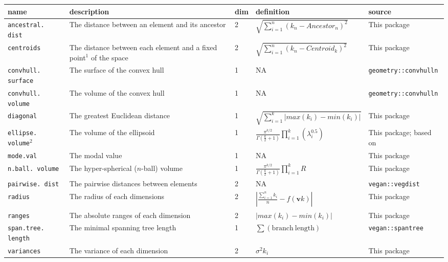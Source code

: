 \documentclass[12pt,letterpaper]{article}
\begin{document}
\begin{table}
\resizebox{\textwidth}{!}
{%
    \begin{tabular}{p{2cm}|p{5cm}|p{1cm}|p{5cm}|p{5cm}}
        name & description & dim & definition & source \\
        \hline
        \texttt{ancestral. dist} & The distance between an element and its ancestor & 2 & $\sqrt{\sum_{i=1}^{n}{({k}_{n}-Ancestor_{n})^2}}$ & This package \\
        \texttt{centroids} & The distance between each element and a fixed point$^1$ of the space & 2 & $\sqrt{\sum_{i=1}^{n}{({k}_{n}-Centroid_{k})^2}}$ & This package \\
        \texttt{convhull. surface} & The surface of the convex hull & 1 & NA & \texttt{geometry::convhulln} \citep{barber1996quickhull,geometryR}\\
        \texttt{convhull. volume} & The volume of the convex hull & 1 & NA & \texttt{geometry::convhulln} \citep{barber1996quickhull,geometryR}\\
        \texttt{diagonal} & The greatest Euclidean distance & 1 & $\sqrt{\sum_{i=1}^{k}|max(k_i) - min(k_i)|}$ & This package \\
        \texttt{ellipse. volume}$^2$ & The volume of the ellipsoid & 1 & $\frac{\pi^{k/2}}{\Gamma(\frac{k}{2}+1)}\displaystyle\prod_{i=1}^{k} (\lambda_{i}^{0.5})$ & This package; based on \cite{DonohueDim}\\
        \texttt{mode.val} & The modal value & 1 & NA & This package\\
        \texttt{n.ball. volume} & The hyper-spherical ($n$-ball) volume & 1 & $\frac{\pi^{k/2}}{\Gamma(\frac{k}{2}+1)}\displaystyle\prod_{i=1}^{k} R$ & This package\\
        \texttt{pairwise. dist} & The pairwise distances between elements & 2 & NA & \texttt{vegan::vegdist} \citep{oksanen2007vegan}\\        
        \texttt{radius} & The radius of each dimensions & 2 & $|\frac{\sum_{i=1}^{n}k_i}{n} - f(\mathbf{v}k)|$ & This package\\
        \texttt{ranges} & The absolute ranges of each dimension & 2 & $|max(k_i) - min(k_i)|$ & This package \\
        \texttt{span.tree. length} & The minimal spanning tree length & 1 & $\sum(\mathrm{branch\ length})$ & \texttt{vegan::spantree} \citep{oksanen2007vegan}\\
        \texttt{variances} & The variance of each dimension & 2 & $\sigma^{2}{k_i}$ & This package \\

\end{tabular}}
\end{table}
\end{document}
